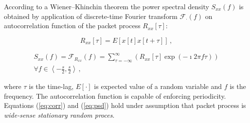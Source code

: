 According to a Wiener–Khinchin %
theorem the power spectral density $S_{xx}(f)$ is obtained by application of discrete-time 
Fourier transform $\mathcal{F}_{\cdot}(f)$ on autocorrelation function 
of the packet process $R_{xx}\left[\tau\right]$:

\begin{equation}\label{eq:corr}
R_{xx}\left[\tau\right] = E[x\left[t\right]x\left[t+\tau\right]]\, , 
\end{equation}

\begin{equation}\label{eq:psd}
\begin{split}
S_{xx}(f) = \mathcal{F}_{R_{xx}}\left(f\right) = \sum_{\tau=-\infty}^{\infty} 
\left( R_{xx}\left[\tau\right] \exp\left( -\imath 2\pi f\tau \right)\right) \\ 
\forall f \in \left\langle -\frac{s}{2},\frac{s}{2} \right\rangle\, , 
\end{split}
\end{equation}

where $\tau$ is the time-lag, $E\left[\cdot\right]$ is expected value of a random variable and 
$f$ is the frequency. The autocorrelation function is capable of enforcing periodicity.
Equations (\ref{eq:corr}) and (\ref{eq:psd}) hold under assumption that packet process is
\emph{wide-sense stationary random proces}.

